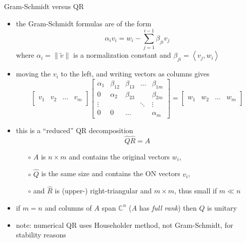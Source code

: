 \documentclass[10pt,hyperref]{beamer}
\newcommand{\CC}{\mathbb{C}}
\newcommand{\ip}[2]{\left<#1,#2\right>}
\newcommand{\trefmatrixthree}[3]{\left[\begin{array}{c|c|c|c} & & & \\ #1 & #2 & \dots & #3 \\ & & & \end{array}\right]}
\begin{document}
\begin{frame}{Gram-Schmidt versus QR}

\begin{itemize}
\item the Gram-Schmidt formulas are of the form
\small
    $$\alpha_i v_i = w_i - \sum_{j=1}^{i-1} \beta_{ji} v_j$$
\normalsize
where $\alpha_i=\|\tilde v\|$ is a normalization constant and $\beta_{ji}=\ip{v_j}{w_i}$
\item moving the $v_i$ to the left, and writing vectors as columns gives
\small
    $$\trefmatrixthree{v_1}{v_2}{v_m}
      \begin{bmatrix} \alpha_1 & \beta_{12} & \beta_{13} & \dots & \beta_{1m} \\
                      0        & \alpha_2   & \beta_{23} &       & \beta_{2m} \\
                      \vdots   &            &            & \ddots & \vdots \\
                      0        & 0          & \dots      &       & \alpha_m \end{bmatrix}
      = \trefmatrixthree{w_1}{w_2}{w_m}$$
\normalsize
\item this is a ``reduced'' QR decomposition
    $$\hat Q \hat R = A$$

\vspace{-1mm}
    \begin{itemize}
    \item[$\circ$] $A$ is $n\times m$ and contains the original vectors $w_i$,
    \item[$\circ$] $\hat Q$ is the same size and contains the ON vectors $v_i$,
    \item[$\circ$] and  $\hat R$ is (upper-) right-triangular and $m\times m$, thus small if $m\ll n$
    \end{itemize}
\item if $m=n$ and columns of $A$ span $\CC^n$ ($A$ has \emph{full rank}) then $Q$ is unitary

\medskip
\footnotesize
\item note: numerical QR uses Householder method, not Gram-Schmidt, for stability reasons
\end{itemize}
\end{frame}
\end{document}
